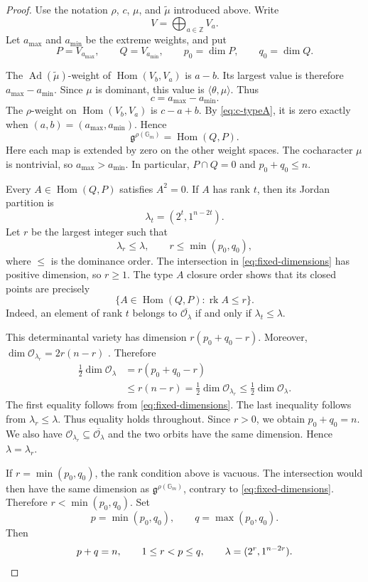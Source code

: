\documentclass[12pt]{article}
\theoremstyle{remark}
\theoremstyle{plain}
\DeclareMathOperator{\rk}{rk}
\newcommand{\Gm}{\mathbb G_m}
\begin{document}
\begin{proof}
Use the notation $\rho$, $c$, $\mu$, and $\widetilde{\mu}$ introduced
above. Write
\[
V=\bigoplus_{a\in\mathbb Z}V_a.
\]
Let $a_{\max}$ and $a_{\min}$ be the extreme weights, and put
\[
P=V_{a_{\max}},\qquad Q=V_{a_{\min}},\qquad
p_0=\dim P,\qquad q_0=\dim Q.
\]

The $\operatorname{Ad}(\widetilde{\mu})$-weight of
$\operatorname{Hom}(V_b,V_a)$ is $a-b$. Its largest value is therefore
$a_{\max}-a_{\min}$. Since $\mu$ is dominant, this value is
$\langle\theta,\mu\rangle$. Thus
\begin{equation}\label{eq:c-typeA}
c=a_{\max}-a_{\min}.
\end{equation}
The $\rho$-weight on $\operatorname{Hom}(V_b,V_a)$ is $c-a+b$.
By \eqref{eq:c-typeA}, it is zero exactly when
$(a,b)=(a_{\max},a_{\min})$. Hence
\[
\mathfrak g^{\rho(\Gm)}=\operatorname{Hom}(Q,P).
\]
Here each map is extended by zero on the other weight spaces. The
cocharacter $\mu$ is nontrivial, so $a_{\max}>a_{\min}$. In
particular, $P\cap Q=0$ and $p_0+q_0\leq n$.

Every $A\in\operatorname{Hom}(Q,P)$ satisfies $A^2=0$. If $A$ has
rank $t$, then its Jordan partition is
\[
\lambda_t=(2^t,1^{n-2t}).
\]
Let $r$ be the largest integer such that
\[
\lambda_r\leq\lambda,\qquad r\leq\min(p_0,q_0),
\]
where $\leq$ is the dominance order. The intersection in
\eqref{eq:fixed-dimensions} has positive dimension, so $r\geq1$.
The type $A$ closure order \cite{KP79} shows that its closed points are
precisely
\[
\{A\in\operatorname{Hom}(Q,P):\rk A\leq r\}.
\]
Indeed, an element of rank $t$ belongs to
$\overline{\mathcal O_\lambda}$ if and only if
$\lambda_t\leq\lambda$.

This determinantal variety has dimension $r(p_0+q_0-r)$. Moreover,
$\dim\mathcal O_{\lambda_r}=2r(n-r)$ \cite{KP79}. Therefore
\[
\begin{aligned}
\frac12\dim\mathcal O_\lambda
&=r(p_0+q_0-r)\\
&\leq r(n-r)
=\frac12\dim\mathcal O_{\lambda_r}
\leq\frac12\dim\mathcal O_\lambda.
\end{aligned}
\]
The first equality follows from \eqref{eq:fixed-dimensions}. The last
inequality follows from $\lambda_r\leq\lambda$. Thus equality holds
throughout. Since $r>0$, we obtain $p_0+q_0=n$. We also have
$\mathcal O_{\lambda_r}\subseteq\overline{\mathcal O_\lambda}$ and
the two orbits have the same dimension. Hence $\lambda=\lambda_r$.

If $r=\min(p_0,q_0)$, the rank condition above is vacuous. The
intersection would then have the same dimension as
$\mathfrak g^{\rho(\Gm)}$, contrary to
\eqref{eq:fixed-dimensions}. Therefore $r<\min(p_0,q_0)$. Set
\[
p=\min(p_0,q_0),\qquad q=\max(p_0,q_0).
\]
Then
\[
p+q=n,\qquad 1\leq r<p\leq q,\qquad
\lambda=(2^r,1^{n-2r}).\qedhere
\]
\end{proof}
\end{document}
